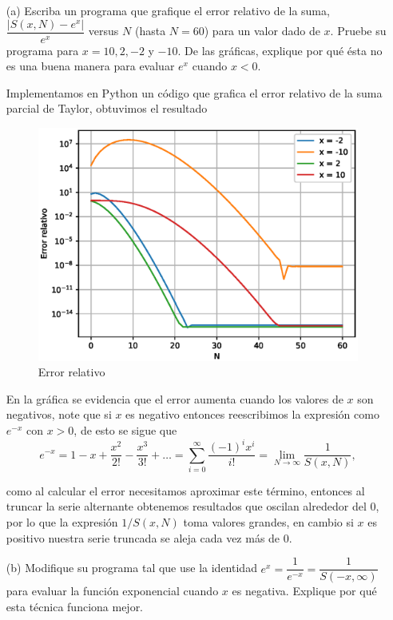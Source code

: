 \documentclass[12pt, a4paper]{article}%
\begin{document}
\begin{itemize}
    \item[(a)] Escriba un programa que grafique el error relativo de la suma, \( \dfrac{|S(x, N) - e^x|}{e^x} \) versus \( N \) (hasta \( N = 60 \)) para un valor dado de \( x \). Pruebe su programa para \( x = 10, 2, -2 \) y \( -10 \). De las gráficas, explique por qué ésta no es una buena manera para evaluar \( e^x \) cuando \( x < 0 \).

    \begin{solution}

    Implementamos en Python un código que grafica el error relativo de la suma parcial de Taylor, obtuvimos el resultado

    \begin{figure}[H]
        \centering
        \includegraphics[width=0.75\linewidth]{Gráficas/AN-T1-P4A.eps}
        \caption{Error relativo}
        \label{coyo4}
    \end{figure}

En la gráfica se evidencia que el error aumenta cuando los valores de $x$ son negativos, note que si $x$ es negativo entonces reescribimos la expresión como $e^{-x}$ con $x>0$, de esto se sigue que
\[
e^{-x} = 1 -x + \frac{x^2}{2!} - \frac{x^3}{3!} + \dots = \sum_{i=0}^{\infty} \frac{(-1)^ix^i}{i!} = \lim_{N \to \infty} \dfrac{1}{S(x,N)},
\]

como al calcular el error necesitamos aproximar este término, entonces al truncar la serie alternante obtenemos resultados que oscilan alrededor del 0, por lo que la expresión $1/S(x,N)$ toma valores grandes, en cambio si $x$ es positivo nuestra serie truncada se aleja cada vez más de 0.
    \end{solution}
    
    \item[(b)] Modifique su programa tal que use la identidad \( e^x = \dfrac{1}{e^{-x}} = \dfrac{1}{S(-x, \infty)} \) para evaluar la función exponencial cuando \( x \) es negativa. Explique por qué esta técnica funciona mejor.


\end{itemize}
\end{document}
